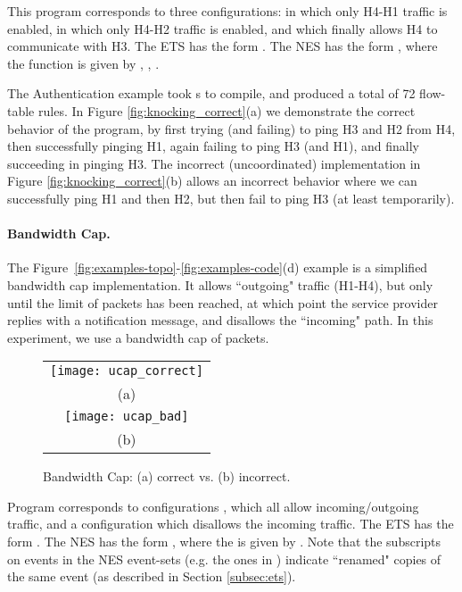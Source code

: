 \documentclass[pldi-cameraready]{sigplanconf}
\begin{document}
This program  corresponds to three configurations:
 in which only H4-H1 traffic is enabled,
 in which only H4-H2 traffic is enabled,
and  which finally allows H4 to communicate with H3.
The ETS has the form .
The NES has the form ,
where the  function is given by , , .

The Authentication example took s to compile, and produced a total of 72 flow-table rules.
In Figure \ref{fig:knocking_correct}(a) we demonstrate the correct behavior of the
program, by first trying (and failing) to ping H3 and H2 from H4, then successfully
pinging H1, again failing to ping H3 (and H1), and finally succeeding in pinging H3.
The incorrect (uncoordinated) implementation in Figure \ref{fig:knocking_correct}(b) allows an incorrect behavior where
we can successfully ping H1 and then H2, but then fail to ping H3 (at least temporarily).

\paragraph{Bandwidth Cap.}
The Figure~\ref{fig:examples-topo}-\ref{fig:examples-code}(d) example
is a simplified bandwidth cap implementation. It allows ``outgoing"
traffic (H1-H4), but only until the limit of  packets
has been reached,
at which point the service provider replies with a notification message, and
disallows the ``incoming" path.
In this experiment, we use a bandwidth cap of  packets.

\begin{figure}[t]
\centering
\bgroup
\def\arraystretch{0.5}
\begin{tabular}{c}
\texttt{[image: ucap\_correct]} \\
{\scriptsize (a)} \\
\texttt{[image: ucap\_bad]} \\
{\scriptsize (b)}
\end{tabular}
\egroup
\caption{Bandwidth Cap: (a) correct vs. (b) incorrect.}
\label{fig:ucap_correct}
\end{figure}

Program  corresponds to configurations
,
which all allow incoming/outgoing traffic, and a configuration 
 which disallows the incoming traffic.
The ETS has the form .
The NES has the form ,
where the  is given by .
Note that the subscripts on events in the NES event-sets (e.g. the ones in ) indicate ``renamed" copies of
the same event (as described in Section \ref{subsec:ets}).
\end{document}
